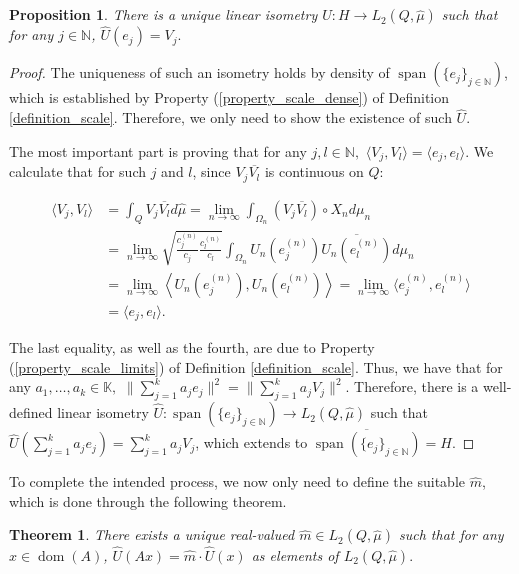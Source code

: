 \documentclass{amsart}
\newtheorem{theorem}{Theorem}[section]
\newtheorem{prop}[thm]{Proposition}
\theoremstyle{definition}
\theoremstyle{remark}
\def \Span{\operatorname{span}}
\def \Dom{\operatorname{dom}}
\def \HMU{\hat{\mu}}
\def \HU{\hat{U}}
\def \Hm{\hat{m}}
\def \LL{\langle}
\def \RR{\rangle}
\begin{document}
\begin{prop}\label{proposition_unique_isometry}
	There is a unique linear isometry $\HU: H\rightarrow L_2(Q,\HMU)$ such that for any $j\in\mathbb{N}$, $\HU(e_j)=V_j.$
\end{prop}
\begin{proof}
	The uniqueness of such an isometry holds by density of $\Span(\{e_j\}_{j\in\mathbb{N}})$, which is established by Property (\ref{property_scale_dense}) of Definition \ref{definition_scale}. Therefore, we only need to show the existence of such $\HU$.
	
	The most important part is proving that for any $j,l\in\mathbb{N},$ $\LL V_j,V_l\RR=\LL e_j, e_l\RR.$ We calculate that for such $j$ and $l$, since $V_j\overline{V_l}$ is continuous on $Q$:
	
	\begin{align*}
		\LL V_j, V_l\RR&=\int_{Q} V_j\overline{V_l}d\HMU=\lim_{n\rightarrow\infty} \int_{\Omega_n} \left(V_j\overline{V_l}\right)\circ X_n d\mu_n\\
		&=\lim_{n\rightarrow\infty}\sqrt{\frac{c_j^{(n)}}{c_j}\frac{c_l^{(n)} }{c_l}}\int_{\Omega_n}U_n\left(e_j^{(n)}\right)\overline{U_n\left(e_l^{(n)}\right)}d\mu_n\\
		&=\lim_{n\rightarrow\infty}\left\LL U_n\left(e_j^{(n)}\right), U_n\left(e_l^{(n)}\right)\right\RR=\lim_{n\rightarrow\infty}\LL e_j^{(n)}, e_l^{(n)}\RR\\
		&=\LL e_j, e_l\RR.
	\end{align*}
	
	The last equality, as well as the fourth, are due to Property (\ref{property_scale_limits}) of Definition \ref{definition_scale}. Thus, we have that for any $a_1,\dots, a_k \in \mathbb{K},$ $\|\sum_{j=1}^{k}a_j e_j\|^2=\|\sum_{j=1}^{k}a_j V_j\|^2.$ Therefore, there is a well-defined linear	 isometry $\HU:\Span(\{e_j\}_{j\in\mathbb{N}})\rightarrow L_2(Q,\HMU)$ such that $\HU(\sum_{j=1}^{k} a_j e_j)=\sum_{j=1}^{k} a_j V_j$, which extends to $\overline{\Span(\{e_j\}_{j\in\mathbb{N}})}=H$. 
\end{proof}

To complete the intended process, we now only need to define the suitable $\Hm$, which is done through the following theorem.
\begin{theorem}\label{theorem_multiplication_operator}
	There exists a unique real-valued $\Hm \in L_2(Q, \HMU)$ such that for any $x\in\Dom(A)$, $\HU(Ax)=\Hm\cdot \HU(x)$ as elements of $L_2(Q,\HMU).$
\end{theorem}
\end{document}
